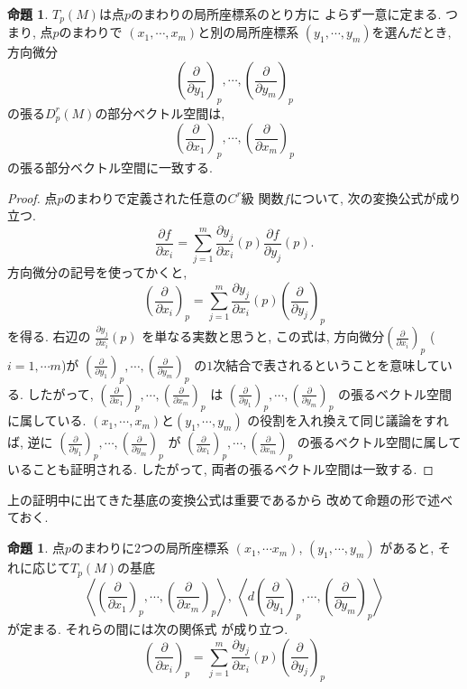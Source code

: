 \documentclass[a4j,12pt]{jarticle}
\theoremstyle{definition}
\newtheorem{proposition}[theorem]{命題}
\begin{document}
    \begin{proposition}
        $T_p(M)$は点$p$のまわりの局所座標系のとり方に
        よらず一意に定まる. つまり, 点$p$のまわりで
        $(x_1,\cdots ,x_m)$と別の局所座標系
        $(y_1,\cdots ,y_m)$を選んだとき, 
        方向微分
        $$\left(\frac{\partial}{\partial y_1}\right)_p, 
        \cdots ,
        \left(\frac{\partial}{\partial y_m}\right)_p$$
        の張る$D_p^r(M)$の部分ベクトル空間は, 
        $$\left(\frac{\partial}{\partial x_1}\right)_p, 
        \cdots ,
        \left(\frac{\partial}{\partial x_m}\right)_p$$
        の張る部分ベクトル空間に一致する. 
    \end{proposition}
    \begin{proof}
        点$p$のまわりで定義された任意の$C^r$級
        関数$f$について, 次の変換公式が成り立つ. 
        $$\frac{\partial f}{\partial x_i}
        =\sum_{j=1}^{m}\frac{\partial y_j}
        {\partial x_i}(p)
        \frac{\partial f}{\partial y_j}(p).$$
        方向微分の記号を使ってかくと, 
        $$\left(\frac{\partial}{\partial x_i}\right)_p=
        \sum_{j=1}^{m}
        \frac{\partial y_j}{\partial x_i}(p)
        \left(\frac{\partial}{\partial y_j}\right)_p$$
        を得る. 右辺の
        $\frac{\partial y_j}{\partial x_i}(p)$
        を単なる実数と思うと, この式は, 
        方向微分$\left(\frac{\partial}{\partial x_i}\right)_p$
        ($i=1,\cdots m$)が
        $\left(\frac{\partial}{\partial y_1}\right)_p, \cdots 
        ,\left(\frac{\partial}{\partial y_m}\right)_p$
        の$1$次結合で表されるということを意味している. 
        したがって, 
        $\left(\frac{\partial}{\partial x_1}\right)_p, \cdots 
        ,\left(\frac{\partial}{\partial x_m}\right)_p$
        は
        $\left(\frac{\partial}{\partial y_1}\right)_p, \cdots 
        ,\left(\frac{\partial}{\partial y_m}\right)_p$
        の張るベクトル空間に属している. 
        $(x_1,\cdots ,x_m)$と$(y_1,\cdots ,y_m)$
        の役割を入れ換えて同じ議論をすれば, 逆に
        $\left(\frac{\partial}{\partial y_1}\right)_p, \cdots 
        ,\left(\frac{\partial}{\partial y_m}\right)_p$
        が
        $\left(\frac{\partial}{\partial x_1}\right)_p, \cdots 
        ,\left(\frac{\partial}{\partial x_m}\right)_p$
        の張るベクトル空間に属していることも証明される. 
        したがって, 両者の張るベクトル空間は一致する. 
    \end{proof}
    上の証明中に出てきた基底の変換公式は重要であるから
    改めて命題の形で述べておく. 
    \begin{proposition}\label{prop:basis conversion}
        点$p$のまわりに$2$つの局所座標系
        $(x_1,\cdots x_m)$, $(y_1,\cdots ,y_m)$
        があると, それに応じて$T_p(M)$の基底
        $$\left<\left(\frac{\partial}
        {\partial x_1}\right)_p,\cdots ,
        \left(\frac{\partial}
        {\partial x_m}\right)_p\right>,\ 
        \left<d\left(\frac{\partial}
        {\partial y_1}\right)_p,\cdots ,
        \left(\frac{\partial}
        {\partial y_m}\right)_p\right>$$
        が定まる. それらの間には次の関係式
        が成り立つ. 
        $$\left(\frac{\partial}{\partial x_i}\right)_p=
        \sum_{j=1}^{m}
        \frac{\partial y_j}{\partial x_i}(p)
        \left(\frac{\partial}{\partial y_j}\right)_p$$
    \end{proposition}
\end{document}
